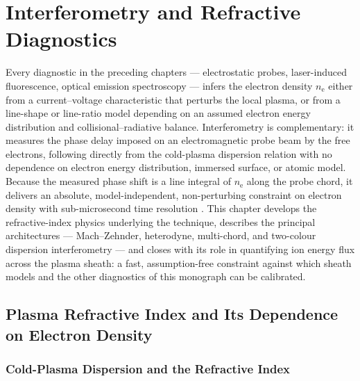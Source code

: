 \chapter{Interferometry and Refractive Diagnostics}
\label{ch:interf}

Every diagnostic in the preceding chapters — electrostatic probes, laser-induced fluorescence, optical emission spectroscopy — infers the electron density $n_{\mathrm{e}}$ either from a current--voltage characteristic that perturbs the local plasma, or from a line-shape or line-ratio model depending on an assumed electron energy distribution and collisional--radiative balance. Interferometry is complementary: it measures the phase delay imposed on an electromagnetic probe beam by the free electrons, following directly from the cold-plasma dispersion relation with no dependence on electron energy distribution, immersed surface, or atomic model. Because the measured phase shift is a line integral of $n_{\mathrm{e}}$ along the probe chord, it delivers an absolute, model-independent, non-perturbing constraint on electron density with sub-microsecond time resolution \cite{ref0391}. This chapter develops the refractive-index physics underlying the technique, describes the principal architectures — Mach--Zehnder, heterodyne, multi-chord, and two-colour dispersion interferometry — and closes with its role in quantifying ion energy flux across the plasma sheath: a fast, assumption-free constraint against which sheath models and the other diagnostics of this monograph can be calibrated.

\section{Plasma Refractive Index and Its Dependence on Electron Density}
\label{sec:interf-refractive}

\subsection{Cold-Plasma Dispersion and the Refractive Index}

